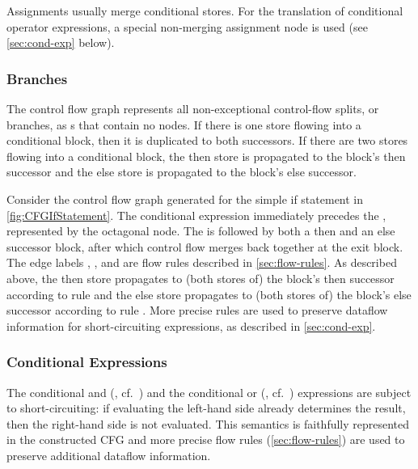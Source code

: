 Assignments usually merge conditional stores. For the translation of
conditional operator expressions, a special non-merging assignment
node is used (see \autoref{sec:cond-exp} below).


\subsubsection{Branches}

The control flow graph represents all non-exceptional control-flow
splits, or branches, as s that contain no
nodes.  If there is one store flowing into a conditional block, then
it is duplicated to both successors.  If there are two stores flowing
into a conditional block, the then store is propagated to the block's
then successor and the else store is propagated to the block's else
successor.

Consider the control flow graph generated for the simple if statement
in \autoref{fig:CFGIfStatement}.  The conditional expression 
immediately precedes the , represented by the
octagonal node.  The  is followed by both a
then and an else successor block, after which control flow merges back
together at the exit block.  The edge labels ,
, and  are flow rules described
in \autoref{sec:flow-rules}.  As described above, the then store
propagates to (both stores of) the block's then successor according to
rule  and the else store propagates to (both stores
of) the block's else successor according to rule .
More precise rules are used to preserve dataflow information for
short-circuiting expressions, as described in \autoref{sec:cond-exp}.


\subsubsection{Conditional Expressions}
\label{sec:cond-exp}

The conditional and (\code{&&}, cf.\ ) and the
conditional or (\code{||}, cf.\ ) expressions are subject
to short-circuiting: if evaluating the left-hand side already
determines the result, then the right-hand side is not evaluated. This
semantics is faithfully represented in the constructed CFG and more
precise flow rules (\autoref{sec:flow-rules}) are used to preserve
additional dataflow information.

